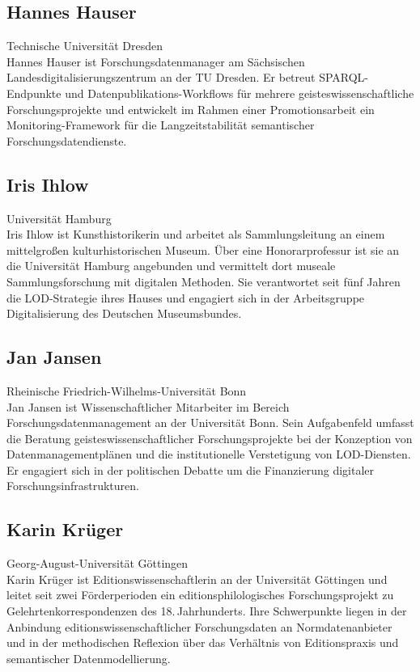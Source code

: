 \subsection*{Hannes Hauser}
\noindent\small Technische Universität Dresden \\
Hannes Hauser ist Forschungsdatenmanager am Sächsischen Landesdigitalisierungszentrum an der TU Dresden. Er betreut SPARQL-Endpunkte und Datenpublikations-Workflows für mehrere geisteswissenschaftliche Forschungsprojekte und entwickelt im Rahmen einer Promotionsarbeit ein Monitoring-Framework für die Langzeitstabilität semantischer Forschungsdatendienste.

\subsection*{Iris Ihlow}
\noindent\small Universität Hamburg \\
Iris Ihlow ist Kunsthistorikerin und arbeitet als Sammlungsleitung an einem mittelgroßen kulturhistorischen Museum. Über eine Honorarprofessur ist sie an die Universität Hamburg angebunden und vermittelt dort museale Sammlungsforschung mit digitalen Methoden. Sie verantwortet seit fünf Jahren die LOD-Strategie ihres Hauses und engagiert sich in der Arbeitsgruppe Digitalisierung des Deutschen Museumsbundes.

\subsection*{Jan Jansen}
\noindent\small Rheinische Friedrich-Wilhelms-Universität Bonn \\
Jan Jansen ist Wissenschaftlicher Mitarbeiter im Bereich Forschungsdatenmanagement an der Universität Bonn. Sein Aufgabenfeld umfasst die Beratung geisteswissenschaftlicher Forschungsprojekte bei der Konzeption von Datenmanagementplänen und die institutionelle Verstetigung von LOD-Diensten. Er engagiert sich in der politischen Debatte um die Finanzierung digitaler Forschungsinfrastrukturen.

\subsection*{Karin Krüger}
\noindent\small Georg-August-Universität Göttingen \\
Karin Krüger ist Editionswissenschaftlerin an der Universität Göttingen und leitet seit zwei Förderperioden ein editionsphilologisches Forschungsprojekt zu Gelehrtenkorrespondenzen des 18.\,Jahrhunderts. Ihre Schwerpunkte liegen in der Anbindung editionswissenschaftlicher Forschungsdaten an Normdatenanbieter und in der methodischen Reflexion über das Verhältnis von Editionspraxis und semantischer Datenmodellierung.

